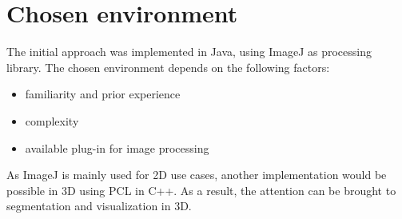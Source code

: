 \section{Chosen environment}

The initial approach was implemented in Java, using ImageJ as processing library. The chosen environment depends on the following factors:
\begin{itemize}
	\item familiarity and prior experience
	\item complexity
	\item available plug-in for image processing
\end{itemize}
As ImageJ is mainly used for 2D use cases, another implementation would be possible in 3D using PCL in C++. As a result, the attention can be brought to segmentation and visualization in 3D.
